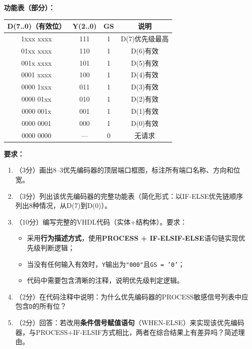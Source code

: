 \vspace{0.3cm}

\textbf{功能表（部分）：}

\begin{center}
\begin{tabular}{|c|c|c|c|}
\hline
\textbf{D(7..0)}（有效位） & \textbf{Y(2..0)} & \textbf{GS} & \textbf{说明} \\
\hline
1xxx xxxx & 111 & 1 & D(7)优先级最高 \\
01xx xxxx & 110 & 1 & D(6)有效 \\
001x xxxx & 101 & 1 & D(5)有效 \\
0001 xxxx & 100 & 1 & D(4)有效 \\
0000 1xxx & 011 & 1 & D(3)有效 \\
0000 01xx & 010 & 1 & D(2)有效 \\
0000 001x & 001 & 1 & D(1)有效 \\
0000 0001 & 000 & 1 & D(0)有效 \\
0000 0000 & --- & 0 & 无请求 \\
\hline
\end{tabular}
\end{center}

\vspace{0.3cm}

\textbf{要求：}
\begin{enumerate}[label=(\arabic*)]
  \item （3分）画出8--3优先编码器的顶层端口框图，标注所有端口名称、方向和位宽。
  \item （3分）列出该优先编码器的完整功能表（简化形式：以IF-ELSE优先链顺序列出8种情况，从D(7)到D(0)）。
  \item （10分）编写完整的VHDL代码（实体+结构体）。要求：
  \begin{itemize}
    \item 采用\textbf{行为描述方式}，使用\textbf{PROCESS + IF-ELSIF-ELSE}语句链实现优先级判断逻辑；
    \item 当没有任何输入有效时，\texttt{Y}输出为\texttt{"000"}且\texttt{GS = '0'}；
    \item 代码中需要包含清晰的注释，说明优先级判定逻辑。
  \end{itemize}
  \item （2分）在代码注释中说明：为什么优先编码器的PROCESS敏感信号列表中应包含\texttt{D}的所有位？
  \item （2分）回答：若改用\textbf{条件信号赋值语句}（WHEN-ELSE）来实现该优先编码器，与PROCESS+IF-ELSIF方式相比，两者在综合结果上有差异吗？简述理由。
\end{enumerate}

